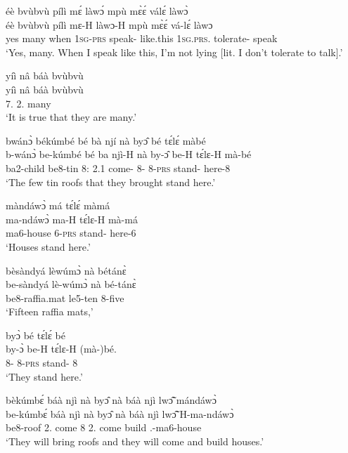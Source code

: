 \begin{exe}[(C234)]  
\exC\label{51}
  \glll   éè bvùbvù pílì mɛ́ làwɔ́ mpù mɛ̀ɛ́ válɛ́ làwɔ̀ \\ 
           éè bvùbvù pílì mɛ-H làwɔ-H mpù mɛ̀ɛ́ vá-lɛ́ làwɔ \\
           yes many when 1\textsc{sg}-\textsc{prs} speak-{\R} like.this 1\textsc{sg}.\textsc{prs}.{\NEG} tolerate-{\NEG} speak  \\
    \trans `Yes, many. When I speak like this, I'm not lying [lit.  I don't tolerate to talk].'
 
\exC\label{52}
  \glll   yíì nâ báà bvùbvù \\
         yíì nâ báà bvùbvù \\
            7.{\COP} {\COMP} 2.{\COP} many \\
    \trans `It is true that they are many.'
 
\exC\label{53}
 \glll  bwánɔ̀ békúmbé bé bà njí nà byɔ̂ bé tɛ́lɛ́ màbé\\
         b-wánɔ̀ be-kúmbé bé ba njì-H nà by-ɔ̂ be-H tɛ́lɛ-H mà-bé\\
          ba2-child be8-tin 8:{\ATT}  2.{\PST}1 come-{\R} {\COM} 8-{\OBJ} 8-\textsc{prs} stand-{\R} here-8\\
    \trans `The few tin roofs that they brought stand here.'
 
\exC\label{54} 
  \glll  màndáwɔ̀ má tɛ́lɛ́ màmá \\
         ma-ndáwɔ̀ ma-H tɛ́lɛ-H mà-má \\
           ma6-house 6-\textsc{prs} stand-{\R} here-6  \\
    \trans `Houses stand here.'
 
\exC\label{55}
  \glll   bèsàndyá lèwúmɔ̀ nà bétánɛ̀ \\
           be-sàndyá lè-wúmɔ̀ nà bé-tánɛ̀ \\
           be8-raffia.mat le5-ten {\CONJ} 8-five  \\
    \trans `Fifteen raffia mats,'
 
\exC\label{56}
  \glll   byɔ̀ bé tɛ́lɛ́ bé \\
         by-ɔ̀ be-H tɛ́lɛ-H (mà-)bé. \\
           8-{\OBJ}  8-\textsc{prs} stand-{\R} 8 \\
    \trans `They stand here.'
 
\exC\label{57} 
  \glll   bèkúmbɛ́ báà njì nà byɔ̂ nà báà njì lwɔ̃̂ mándáwɔ̀\\
          be-kúmbɛ́ báà njì nà byɔ̂ nà báà njì lwɔ̃̂ H-ma-ndáwɔ̀\\
           be8-roof  2.{\FUT} come {\COM} 8 {\CONJ} 2.{\FUT} come build {\OBJ}.{\LINK}-ma6-house\\
    \trans `They will bring roofs and they will come and build houses.'
 

\end{exe}
